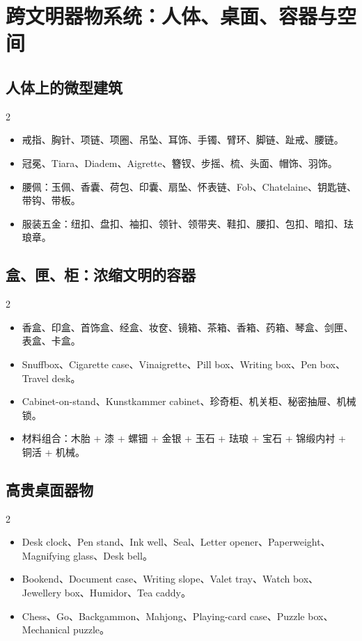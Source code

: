 \documentclass[lang=en,a4paper,11pt]{elegantpaper}
\begin{document}
\section{跨文明器物系统：人体、桌面、容器与空间}


\subsection{人体上的微型建筑}


\begin{multicols}{2}
\begin{itemize}
\item 戒指、胸针、项链、项圈、吊坠、耳饰、手镯、臂环、脚链、趾戒、腰链。
\item 冠冕、Tiara、Diadem、Aigrette、簪钗、步摇、梳、头面、帽饰、羽饰。
\item 腰佩：玉佩、香囊、荷包、印囊、扇坠、怀表链、Fob、Chatelaine、钥匙链、带钩、带板。
\item 服装五金：纽扣、盘扣、袖扣、领针、领带夹、鞋扣、腰扣、包扣、暗扣、珐琅章。
\end{itemize}
\end{multicols}

\subsection{盒、匣、柜：浓缩文明的容器}


\begin{multicols}{2}
\begin{itemize}
\item 香盒、印盒、首饰盒、经盒、妆奁、镜箱、茶箱、香箱、药箱、琴盒、剑匣、表盒、卡盒。
\item Snuffbox、Cigarette case、Vinaigrette、Pill box、Writing box、Pen box、Travel desk。
\item Cabinet-on-stand、Kunstkammer cabinet、珍奇柜、机关柜、秘密抽屉、机械锁。
\item 材料组合：木胎 + 漆 + 螺钿 + 金银 + 玉石 + 珐琅 + 宝石 + 锦缎内衬 + 铜活 + 机械。
\end{itemize}
\end{multicols}

\subsection{高贵桌面器物}


\begin{multicols}{2}
\begin{itemize}
\item Desk clock、Pen stand、Ink well、Seal、Letter opener、Paperweight、Magnifying glass、Desk bell。
\item Bookend、Document case、Writing slope、Valet tray、Watch box、Jewellery box、Humidor、Tea caddy。
\item Chess、Go、Backgammon、Mahjong、Playing-card case、Puzzle box、Mechanical puzzle。
\end{itemize}
\end{multicols}
\end{document}
